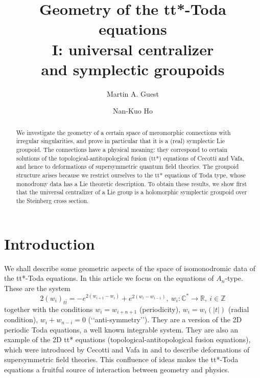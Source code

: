 \documentclass[a4paper,12pt,leqno]{amsart}
\numberwithin{equation}{section}
\theoremstyle{plain}
\theoremstyle{definition}
\newcommand{\C}{\mathbb C}
\newcommand{\R}{\mathbb R}
\newcommand{\Z}{\mathbb Z}
\renewcommand{\ll}{\lq\lq}
\newcommand{\rrr}{\rq\rq}
\newcommand{\ttb}{ {t\bar t}  }
\begin{document}
\title[tt*-Toda and symplectic groupoids]{Geometry of the tt*-Toda equations
\\
I: universal centralizer
\\
and symplectic groupoids
}


\author{Martin A. Guest}
\address{Department of Mathematics, Waseda University, 3-4-1 Okubo, Shinjuku, Tokyo 169-8555, Japan}

\author{Nan-Kuo Ho}
\address{Department of Mathematics, National Tsing Hua University, Hsinchu 300, and National Center for Theoretical Sciences, Taipei 106,  Taiwan}

\date{}

\begin{abstract}
We investigate the geometry of a certain space of meromorphic connections with irregular singularities, and prove in particular that it is a (real) symplectic Lie groupoid.
The connections have a physical meaning: they correspond to certain solutions of the topological-antitopological fusion (tt*) equations of Cecotti and Vafa, and hence to deformations of supersymmetric quantum field theories. The groupoid structure
arises because we restrict ourselves to the tt* equations of Toda type, whose monodromy data has a Lie theoretic description. To obtain these results, we show first that the universal centralizer of a Lie group is a holomorphic symplectic groupoid over the Steinberg cross section.\end{abstract}


\maketitle

\section{Introduction}\label{intro}

We shall describe some geometric aspects of the space of isomonodromic data
of the tt*-Toda equations.  In this article we focus on the equations of $A_n$-type.
These are the system
\begin{equation}\label{ost}
 2(w_i)_{\ttb}=-e^{2(w_{i+1}-w_{i})} + e^{2(w_{i}-w_{i-1})}, \
 w_i:\C^\ast\to\R, \
 i\in\Z
\end{equation}
together with the conditions
$w_i=w_{i+n+1}$ (periodicity),
$w_i=w_i(\vert t\vert)$
(radial condition),
$w_i+w_{n-i}=0$
(\ll anti-symmetry\rrr).
They are a version of the 2D periodic Toda equations, a well known integrable system. They are also an
example of the 2D tt* equations (topological-antitopological fusion equations),  which were introduced by Cecotti and Vafa in \cite{CeVa91} and \cite{CeVa92a} to describe deformations of supersymmetric field theories.
This confluence of ideas makes the tt*-Toda equations a fruitful source of interaction between geometry and physics.
\end{document}
